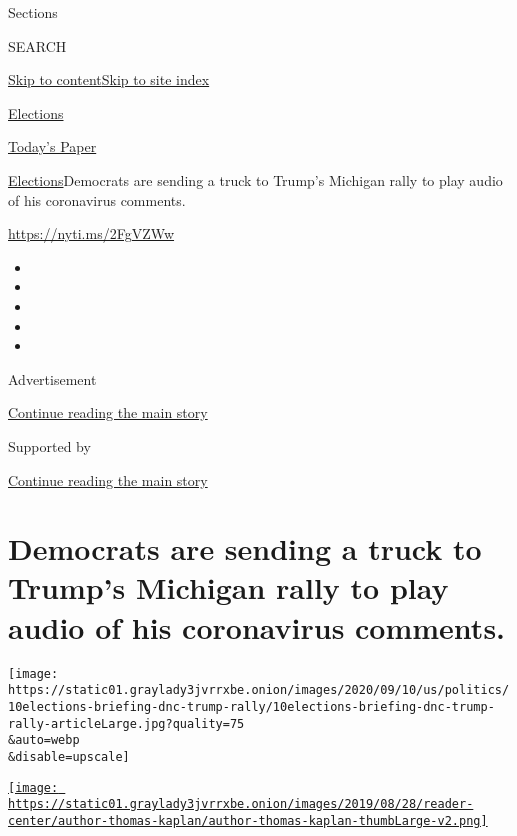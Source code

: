 Sections

SEARCH

\protect\hyperlink{site-content}{Skip to
content}\protect\hyperlink{site-index}{Skip to site index}

\href{https://www.nytimes3xbfgragh.onion/news-event/2020-election}{Elections}

\href{https://myaccount.nytimes3xbfgragh.onion/auth/login?response_type=cookie\&client_id=vi}{}

\href{https://www.nytimes3xbfgragh.onion/section/todayspaper}{Today's
Paper}

\href{/news-event/2020-election}{Elections}\textbar{}Democrats are
sending a truck to Trump's Michigan rally to play audio of his
coronavirus comments.

\url{https://nyti.ms/2FgVZWw}

\begin{itemize}
\item
\item
\item
\item
\item
\end{itemize}

Advertisement

\protect\hyperlink{after-top}{Continue reading the main story}

Supported by

\protect\hyperlink{after-sponsor}{Continue reading the main story}

\hypertarget{democrats-are-sending-a-truck-to-trumps-michigan-rally-to-play-audio-of-his-coronavirus-comments}{%
\section{Democrats are sending a truck to Trump's Michigan rally to play
audio of his coronavirus
comments.}\label{democrats-are-sending-a-truck-to-trumps-michigan-rally-to-play-audio-of-his-coronavirus-comments}}

\texttt{[image: https://static01.graylady3jvrrxbe.onion/images/2020/09/10/us/politics/10elections-briefing-dnc-trump-rally/10elections-briefing-dnc-trump-rally-articleLarge.jpg?quality=75\\\&auto=webp\\\&disable=upscale]}

\href{https://www.nytimes3xbfgragh.onion/by/thomas-kaplan}{\texttt{[image: https://static01.graylady3jvrrxbe.onion/images/2019/08/28/reader-center/author-thomas-kaplan/author-thomas-kaplan-thumbLarge-v2.png]}}

